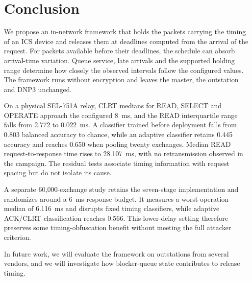 \section{Conclusion}
\label{sec:conclusion}

We propose an in-network framework that holds the
packets carrying the timing of an ICS device and releases them at deadlines computed from the
arrival of the request. For packets available before their deadlines, the schedule can absorb arrival-time variation.
Queue service, late arrivals and the supported holding range determine how closely the observed
intervals follow the configured values. The framework runs without encryption and leaves the master,
the outstation and DNP3 unchanged.

On a physical SEL-751A relay, CLRT medians for READ, SELECT and OPERATE approach the configured
8~ms, and the READ interquartile range falls from 2.772 to 0.022~ms. A classifier trained before
deployment falls from 0.803 balanced accuracy to chance, while an adaptive classifier retains
0.445 accuracy and reaches 0.650 when pooling twenty exchanges. Median READ request-to-response
time rises to 28.107~ms, with no retransmission observed in the campaign. The residual tests
associate timing information with request spacing but do not isolate its cause.

A separate 60{,}000-exchange study retains the seven-stage implementation and randomizes around
a 6~ms response budget. It measures a worst-operation median of 6.116~ms and disrupts fixed
timing classifiers, while adaptive ACK/CLRT classification reaches 0.566. This lower-delay
setting therefore preserves some timing-obfuscation benefit without meeting the full attacker criterion.

In future work, we will evaluate the framework on outstations from several vendors, and we will
investigate how blocker-queue state contributes to release timing.
